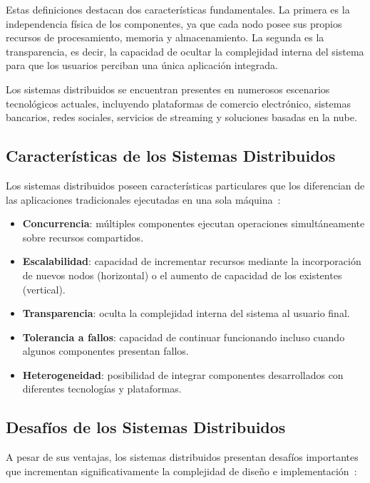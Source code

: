 Estas definiciones destacan dos características fundamentales. La primera es la independencia física de los componentes, ya que cada nodo posee sus propios recursos de procesamiento, memoria y almacenamiento. La segunda es la transparencia, es decir, la capacidad de ocultar la complejidad interna del sistema para que los usuarios perciban una única aplicación integrada.

Los sistemas distribuidos se encuentran presentes en numerosos escenarios tecnológicos actuales, incluyendo plataformas de comercio electrónico, sistemas bancarios, redes sociales, servicios de streaming y soluciones basadas en la nube.

\subsection{Características de los Sistemas Distribuidos}

Los sistemas distribuidos poseen características particulares que los diferencian de las aplicaciones tradicionales ejecutadas en una sola máquina~\parencite{coulouris2012}:

\begin{itemize}
    \item \textbf{Concurrencia}: múltiples componentes ejecutan operaciones simultáneamente sobre recursos compartidos.
    \item \textbf{Escalabilidad}: capacidad de incrementar recursos mediante la incorporación de nuevos nodos (horizontal) o el aumento de capacidad de los existentes (vertical).
    \item \textbf{Transparencia}: oculta la complejidad interna del sistema al usuario final.
    \item \textbf{Tolerancia a fallos}: capacidad de continuar funcionando incluso cuando algunos componentes presentan fallos.
    \item \textbf{Heterogeneidad}: posibilidad de integrar componentes desarrollados con diferentes tecnologías y plataformas.
\end{itemize}

\subsection{Desafíos de los Sistemas Distribuidos}

A pesar de sus ventajas, los sistemas distribuidos presentan desafíos importantes que incrementan significativamente la complejidad de diseño e implementación~\parencite{kleppmann2017}:


